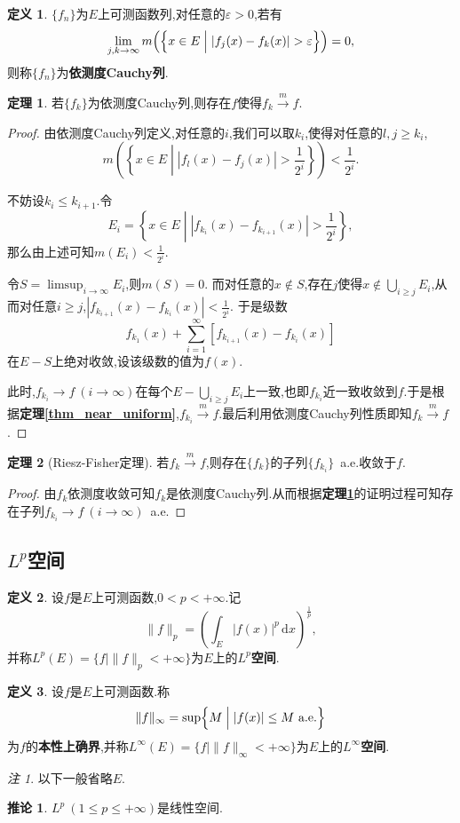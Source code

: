 \documentclass{ctexart}
\theoremstyle{definition}
\newtheorem{definition}{定义}
\newtheorem{theorem}{定理}
\newtheorem{corollary}{推论}
\theoremstyle{remark}
\newtheorem*{remark}{注}
\begin{document}
	\begin{definition}
		$\{f_n\}$为$E$上可测函数列,对任意的$\varepsilon>0$,若有
		$$\lim_{j,k\to\infty}{m\Bigl(\Bigl\{x\in E\Bigm| |f_j(x)-f_k(x)|>\varepsilon\Bigr\}\Bigr)}=0,$$
		则称$\{f_n\}$为\textbf{依测度Cauchy列}.
	\end{definition}
	\begin{theorem}\label{thm_measure_cauchy}
		若$\{f_k\}$为依测度Cauchy列,则存在$f$使得$f_k\xrightarrow{m}f$.
	\end{theorem}
	\begin{proof}
		由依测度Cauchy列定义,对任意的$i$,我们可以取$k_i$,使得对任意的$l,j\ge k_i$,
		$$m\left(\left\{x\in E\middle| |f_l(x)-f_j(x)|>\frac{1}{2^i}\right\}\right)
		<\frac{1}{2^i}.$$
		
		不妨设$k_i\le k_{i+1}$.令
		$$E_i=\left\{x\in E\middle| |f_{k_i}(x)-f_{k_{i+1}}(x)|>\frac{1}{2^i}\right\},$$
		那么由上述可知$m(E_i)<\frac{1}{2^i}$.
		
		令$S=\limsup_{i\to\infty}{E_i}$,则$m(S)=0$.
		而对任意的$x\notin S$,存在$j$使得$x\notin\bigcup_{i\ge j}{E_i}$,从而对任意$i\ge j$,$|f_{k_{i+1}}(x)-f_{k_i}(x)|<\frac{1}{2^i}$.
		于是级数
		$$f_{k_1}(x)+\sum_{i=1}^\infty{\left[f_{k_{i+1}}(x)-f_{k_i}(x)\right]}$$
		在$E-S$上绝对收敛,设该级数的值为$f(x)$.
		
		此时,$f_{k_i}\to f\ (i\to\infty)$在每个$E-\bigcup_{i\ge j}{E_i}$上一致,也即$f_{k_i}$近一致收敛到$f$.于是根据\textbf{定理\ref{thm_near_uniform}},$f_{k_i}\xrightarrow{m}f$.最后利用依测度Cauchy列性质即知$f_k\xrightarrow{m}f$.
	\end{proof}
	\begin{theorem}[Riesz-Fisher定理]
		若$f_k\xrightarrow{m}f$,则存在$\{f_k\}$的子列$\{f_{k_i}\}$\ a.e.收敛于$f$.
	\end{theorem}
	\begin{proof}
		由$f_k$依测度收敛可知$f_k$是依测度Cauchy列.从而根据\textbf{定理\ref{thm_measure_cauchy}}的证明过程可知存在子列$f_{k_i}\to f\ (i\to\infty)$\ a.e.
	\end{proof}
	
	\subsection{$L^p$空间}
	
	\begin{definition}
		设$f$是$E$上可测函数,$0<p<+\infty$.记
		$$\|f\|_p=\left(\int_E{|f(x)|^p\,\mathrm{d}x}\right)^\frac{1}{p},$$
		并称$L^p(E)=\{f\mid\|f\|_p<+\infty\}$为$E$上的\textbf{$L^p$空间}.
	\end{definition}
	\begin{definition}
		设$f$是$E$上可测函数.称
		$$\|f\|_\infty=\sup\Bigl\{M\Bigm| |f(x)|\le M\ \mbox{a.e.}\Bigr\}$$
		为$f$的\textbf{本性上确界},并称$L^\infty(E)=\{f\mid\|f\|_\infty<+\infty\}$为$E$上的\textbf{$L^\infty$空间}.
	\end{definition}
	\begin{remark}
		以下一般省略$E$.
	\end{remark}
	\begin{corollary}
		$L^p\ (1\le p\le+\infty)$是线性空间.
	\end{corollary}
	
\end{document}
